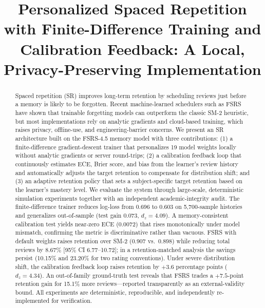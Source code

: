 \documentclass[conference]{IEEEtran}
\begin{document}
\title{Personalized Spaced Repetition with Finite-Difference Training and Calibration Feedback: A Local, Privacy-Preserving Implementation}

\author{
}

\maketitle

\begin{abstract}
Spaced repetition (SR) improves long-term retention by scheduling reviews just before a memory is likely to be forgotten. Recent machine-learned schedulers such as FSRS have shown that trainable forgetting models can outperform the classic SM-2 heuristic, but most implementations rely on analytic gradients and cloud-based training, which raises privacy, offline-use, and engineering-barrier concerns. We present an SR architecture built on the FSRS-4.5 memory model with three contributions: (1) a finite-difference gradient-descent trainer that personalizes 19 model weights locally without analytic gradients or server round-trips; (2) a calibration feedback loop that continuously estimates ECE, Brier score, and bias from the learner's review history and automatically adjusts the target retention to compensate for distribution shift; and (3) an adaptive retention policy that sets a subject-specific target retention based on the learner's mastery level. We evaluate the system through large-scale, deterministic simulation experiments together with an independent academic-integrity audit. The finite-difference trainer reduces log-loss from 0.696 to 0.603 on 5{,}700-sample histories and generalizes out-of-sample (test gain 0.073, $d_z=4.09$). A memory-consistent calibration test yields near-zero ECE (0.0072) that rises monotonically under model mismatch, confirming the metric is discriminative rather than vacuous. FSRS with default weights raises retention over SM-2 (0.907 vs.\ 0.898) while reducing total reviews by 8.67\% [95\% CI 6.77--10.72]; in a retention-matched analysis the savings persist (10.15\% and 23.20\% for two rating conventions). Under severe distribution shift, the calibration feedback loop raises retention by $+3.6$ percentage points ($d_z=4.34$). An out-of-family ground-truth test reveals that FSRS trades a $+7.5$-point retention gain for 15.1\% more reviews---reported transparently as an external-validity bound. All experiments are deterministic, reproducible, and independently re-implemented for verification.
\end{abstract}
\end{document}
